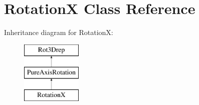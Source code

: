 \hypertarget{classRotationX}{}\section{RotationX Class Reference}
\label{classRotationX}
Inheritance diagram for RotationX\+:\begin{figure}[H]
\begin{center}
\leavevmode
\includegraphics[height=3.000000cm]{classRotationX}
\end{center}
\end{figure}
